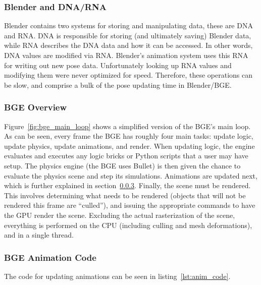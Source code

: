 \subsubsection{Blender and DNA/RNA}
\label{sec:bf_dna_rna}

Blender contains two systems for storing and manipulating data, these are DNA and RNA. DNA is responsible for storing (and ultimately saving) Blender data, while RNA describes the DNA data and how it can be accessed.
In other words, DNA values are modified via RNA.
Blender's animation system uses this RNA for writing out new pose data.
Unfortunately looking up RNA values and modifying them were never optimized for speed.
Therefore, these operations can be slow, and comprise a bulk of the pose updating time in Blender/BGE.


\subsubsection{BGE Overview}
\label{sec:bge_general_overview}


Figure~\ref{fig:bge_main_loop} shows a simplified version of the BGE's main loop.
As can be seen, every frame the BGE has roughly four main tasks: update logic, update physics, update animations, and render.
When updating logic, the engine evaluates and executes any logic bricks or Python scripts that a user may have setup.
The physics engine (the BGE uses Bullet) is then given the chance to evaluate the physics scene and step its simulations.
Animations are updated next, which is further explained in section~\ref{sec:bge_anim_overview}.
Finally, the scene must be rendered.
This involves determining what needs to be rendered (objects that will not be rendered this frame are ``culled''), and issuing the appropriate commands to have the GPU render the scene.
Excluding the actual rasterization of the scene, everything is performed on the CPU (including culling and mesh deformations), and in a single thread.

\subsubsection{BGE Animation Code}
\label{sec:bge_anim_overview}

The code for updating animations can be seen in listing~\ref{lst:anim_code}.

